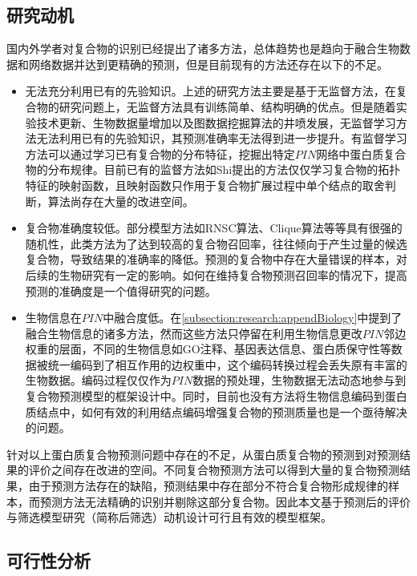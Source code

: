 \subsection{研究动机}
\label{subsection:motivationAndThinking:motivation}
国内外学者对复合物的识别已经提出了诸多方法，总体趋势也是趋向于融合生物数据和网络数据并达到更精确的预测，但是目前现有的方法还存在以下的不足。
\begin{itemize}

  \item 无法充分利用已有的先验知识。上述的研究方法主要是基于无监督方法，在复合物的研究问题上，无监督方法具有训练简单、结构明确的优点。但是随着实验技术更新、生物数据量增加以及图数据挖掘算法的井喷发展，无监督学习方法无法利用已有的先验知识，其预测准确率无法得到进一步提升。有监督学习方法可以通过学习已有复合物的分布特征，挖掘出特定$PIN$网络中蛋白质复合物的分布规律。目前已有的监督方法如Shi提出的方法\cite{shi_protein_2011}仅仅学习复合物的拓扑特征的映射函数，且映射函数只作用于复合物扩展过程中单个结点的取舍判断，算法尚存在大量的改进空间。

  \item 复合物准确度较低。部分模型方法如RNSC算法\cite{king_protein_2004}、Clique算法\cite{spirin_protein_2003}等等具有很强的随机性，此类方法为了达到较高的复合物召回率，往往倾向于产生过量的候选复合物，导致结果的准确率的降低。预测的复合物中存在大量错误的样本，对后续的生物研究有一定的影响。如何在维持复合物预测召回率的情况下，提高预测的准确度是一个值得研究的问题。

  \item 生物信息在$PIN$中融合度低。在\ref{subsection:research:appendBiology}中提到了融合生物信息的诸多方法，然而这些方法只停留在利用生物信息更改$PIN$邻边权重的层面，不同的生物信息如GO注释、基因表达信息、蛋白质保守性等数据被统一编码到了相互作用的边权重中，这个编码转换过程会丢失原有丰富的生物数据。编码过程仅仅作为$PIN$数据的预处理，生物数据无法动态地参与到复合物预测模型的框架设计中。同时，目前也没有方法将生物信息编码到蛋白质结点中，如何有效的利用结点编码增强复合物的预测质量也是一个亟待解决的问题。
\end{itemize}

针对以上蛋白质复合物预测问题中存在的不足，从蛋白质复合物的预测到对预测结果的评价之间存在改进的空间。不同复合物预测方法可以得到大量的复合物预测结果，由于预测方法存在的缺陷，预测结果中存在部分不符合复合物形成规律的样本，而预测方法无法精确的识别并剔除这部分复合物。因此本文基于预测后的评价与筛选模型研究（简称后筛选）动机设计可行且有效的模型框架。

\subsection{可行性分析}
\label{subsection:motivationAndThinking:cando}

